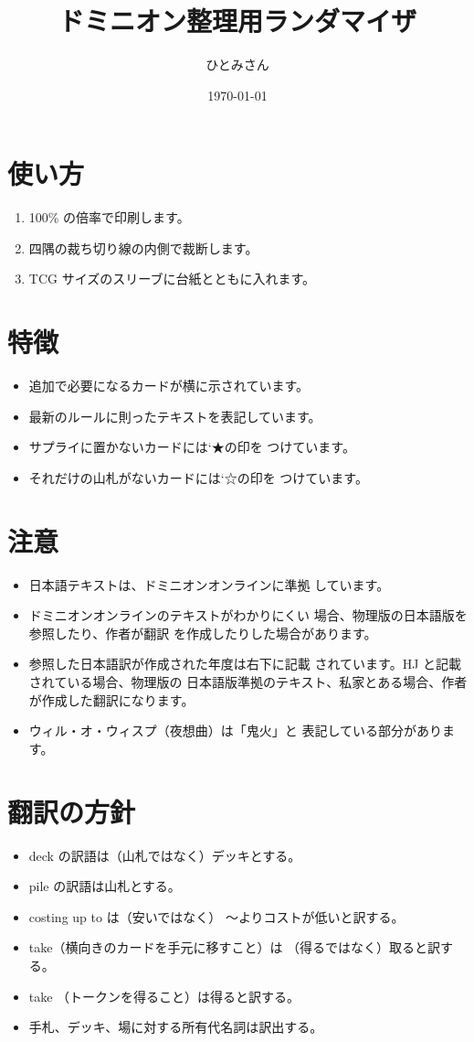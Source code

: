 \documentclass{waku}
\begin{document}
\title{ドミニオン整理用ランダマイザ}
\date{\today}
\author{ひとみさん}
\maketitle
\section{使い方}
\begin{enumerate}
	\item 100\% の倍率で印刷します。
	\item 四隅の裁ち切り線の内側で裁断します。
	\item TCG サイズのスリーブに台紙とともに入れます。
\end{enumerate}
\section{特徴}
\begin{itemize}
	\item 追加で必要になるカードが横に示されています。
	\item 最新のルールに則ったテキストを表記しています。
	\item サプライに置かないカードには\ltjjachar`★の印を
		つけています。
	\item それだけの山札がないカードには\ltjjachar`☆の印を
		つけています。
\end{itemize}
\pagebreak
\section{注意}
\begin{itemize}
	\item 日本語テキストは、ドミニオンオンラインに準拠
		しています。
	\item ドミニオンオンラインのテキストがわかりにくい
		場合、物理版の日本語版を参照したり、作者が翻訳
		を作成したりした場合があります。
	\item 参照した日本語訳が作成された年度は右下に記載
		されています。HJ と記載されている場合、物理版の
		日本語版準拠のテキスト、私家とある場合、作者
		が作成した翻訳になります。
	\item ウィル・オ・ウィスプ（夜想曲）は「鬼火」と
		表記している部分があります。
\end{itemize}
\section{翻訳の方針}
\begin{itemize}
	\item deck の訳語は（山札ではなく）デッキとする。
	\item pile の訳語は山札とする。
	\item costing up to \Coin{} は（安いではなく）
		〜よりコストが低いと訳する。
	\item take（横向きのカードを手元に移すこと）は
		（得るではなく）取ると訳する。
	\item take （トークンを得ること）は得ると訳する。
	\item 手札、デッキ、場に対する所有代名詞は訳出する。
\end{itemize}
\end{document}
